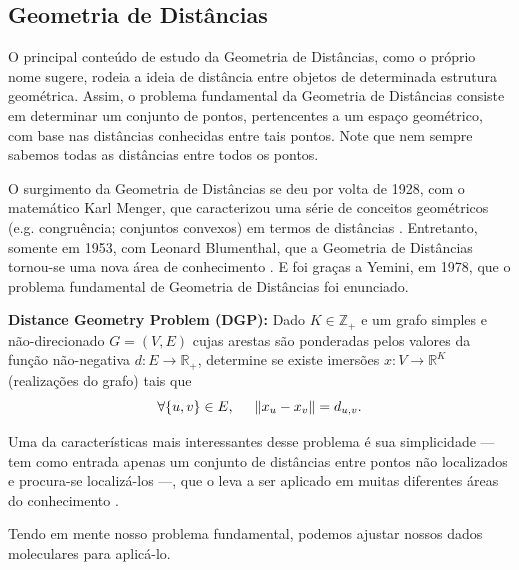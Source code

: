 \documentclass[a4paper,12pt]{article}
\begin{document}
	\subsection{Geometria de Distâncias}
	O principal conteúdo de estudo da Geometria de Distâncias, como o próprio nome sugere, rodeia a ideia de distância entre objetos de determinada estrutura geométrica. Assim, o problema fundamental da Geometria de Distâncias consiste em determinar um conjunto de pontos, pertencentes a um espaço geométrico, com base nas distâncias conhecidas entre tais pontos. Note que nem sempre sabemos todas as distâncias entre todos os pontos.
	
	O surgimento da Geometria de Distâncias se deu por volta de 1928, com o matemático Karl Menger, que caracterizou uma série de conceitos geométricos (e.g. congruência; conjuntos convexos) em termos de distâncias \cite{carlileGDandAplications}. Entretanto, somente em 1953, com Leonard Blumenthal, que a Geometria de Distâncias tornou-se uma nova área de conhecimento \cite{carlileBook31Coloquio}. E foi graças a Yemini, em 1978, que o problema fundamental de Geometria de Distâncias foi enunciado.
	
	\begin{center}
		\begin{minipage}{0.9 \linewidth}
			\textbf{Distance Geometry Problem (DGP):} Dado $K \in \mathbb{Z}_{+}$ e um grafo simples e não-direcionado $G = (V,E)$ cujas arestas são ponderadas pelos valores da função não-negativa $d: E \longrightarrow \mathbb{R}_{+}$, determine se existe imersões $x:V \longrightarrow \mathbb{R}^{K}$ (realizações do grafo) tais que
			\begin{equation}
			\forall \{u,v\} \in E, \hspace{0.5cm} \left\| x_{u} - x_{v} \right\| = d_{u,v}. \label{eq:DGP}
			\end{equation}
		\end{minipage}
	\end{center}
	
	 Uma da características mais interessantes desse problema é sua simplicidade --- tem como entrada apenas um conjunto de distâncias entre pontos não localizados e procura-se localizá-los ---, que o leva a ser aplicado em muitas diferentes áreas do conhecimento \cite{carlileGDandAplications}. 
	
	Tendo em mente nosso problema fundamental, podemos ajustar nossos dados moleculares para aplicá-lo.
	
\end{document}
